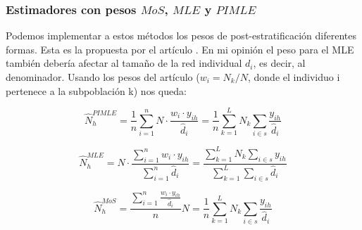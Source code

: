 \documentclass{article}
\begin{document}
\subsubsection{ Estimadores con pesos $MoS$, $MLE$ y $PIMLE$}
Podemos implementar a estos métodos los pesos de post-estratificación diferentes formas. Esta es la propuesta por el artículo \cite{MoS}. En mi opinión el peso para el MLE también debería afectar al tamaño de la red individual $d_i$, es decir, al denominador. Usando los pesos del artículo \cite{Poststrat} ($w_i = N_k/N$, donde el individuo i pertenece a la subpoblación k) nos queda:

\begin{equation} \label{WPIMLE}
    \hat{N}_{h}^{PIMLE} = \frac{1}{n}\sum_{i=1}^{n}N\cdot\frac{w_i \cdot y_{ih}}{\hat{d}_i} = \frac{1}{n}\sum_{k=1}^{L}N_k\sum_{i\in s}\frac{ y_{ih}}{\hat{d}_i}
\end{equation}

\begin{equation} \label{WMLE}
    \hat{N}_h^{MLE} = N\cdot\frac{\sum_{i=1}^n w_i \cdot y_{ih}}{\sum_{i=1}^n\hat{d}_i} = \frac{\sum_{k=1}^LN_k\sum_{i\in s} y_{ih}}{\sum_{k=1}^L\sum_{i\in s} \hat{d}_i}
\end{equation}

\begin{equation} \label{WMoS}
    \hat{N}_h^{MoS} =  \frac{\sum_{i = 1}^n\frac{ w_i \cdot y_{ih}}{\hat{d}_i}}{n}N = \frac{1}{n}\sum_{k=1}^{L}N_k\sum_{i\in s}\frac{ y_{ih}}{\hat{d}_i}
\end{equation}
\end{document}
